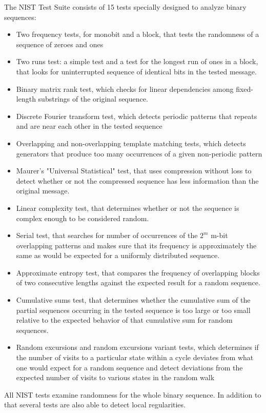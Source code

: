 \documentclass[conference]{IEEEtran}
\begin{document}
The NIST Test Suite consists of 15 tests specially designed to analyze
binary sequences:
\begin{itemize}
  \item Two frequency tests, for monobit and a block, that tests the randomness of a sequence of zeroes and ones
  \item Two runs test: a simple test and a test for the longest run of ones in a block, that looks for uninterrupted sequence of identical bits in the tested message.
  \item Binary matrix rank test, which checks for linear dependencies among fixed-length substrings of the original sequence.
  \item Discrete Fourier transform test, which detects periodic  patterns that repeats and are near each other in the tested sequence
  \item Overlapping and non-overlapping template matching tests, which detects generators that produce too many occurrences of a given non-periodic pattern
  \item Maurer’s "Universal Statistical" test, that uses compression without loss to detect whether or not the compressed sequence has less information than the original message.
  \item Linear complexity test, that determines whether or not the sequence is complex enough to be considered random.
  \item Serial test,  that searches for number of occurrences of the $2^m$ m-bit overlapping patterns and makes sure that its frequency is approximately the same as would be expected for a uniformly distributed sequence.
   \item Approximate entropy test, that compares the frequency of overlapping blocks of two consecutive lengths against the expected result for a random sequence.
   \item Cumulative sums test, that determines whether the cumulative sum of the partial sequences occurring in the tested sequence is too large or too small relative to the expected behavior of that cumulative sum for random sequences.
   \item Random excursions and random excursions variant tests, which determines if the number of visits to a particular state within a cycle deviates from what one would expect for a random sequence and detect deviations from the expected number of visits to various states in the random walk
  
\end{itemize}
 All NIST tests examine randomness for the whole binary sequence. In addition to that several tests are also able to detect local regularities. 
\end{document}
